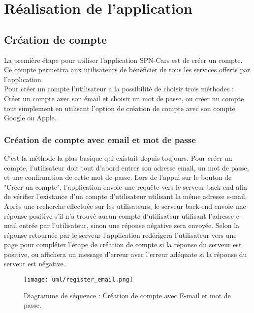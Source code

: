 \thispagestyle{plain}
\section{Réalisation de l'application}
\subsection{Création de compte}
La première étape pour utiliser l'application SPN-Cars est de créer un compte. Ce compte permettra aux utilisateurs de bénéficier de tous les services offerts par l'application.\\
\noindent Pour créer un compte l'utilisateur a la possibilité de choisir trois méthodes : Créer un compte avec son émail et choisir un mot de passe, ou créer un compte tout simplement en utilisant l'option de création de compte avec son compte Google ou Apple.
\subsubsection{Création de compte avec email et mot de passe}
C'est la méthode la plus basique qui existait depuis toujours. Pour créer un compte, l'utilisateur doit tout d'abord entrer son adresse email, un mot de passe, et une confirmation de cette mot de passe. Lors de l'appui sur le bouton de "Créer un compte", l'application envoie une requête vers le serveur back-end afin de vérifier l'existance d'un compte d'utilisateur utilisant la même adresse e-mail. Après une recherche effectuée sur les utilisateurs, le serveur back-end envoie une réponse positive s'il n'a trouvé aucun compte d'utilisateur utilisant l'adresse e-mail entrée par l'utilisateur, sinon une réponse négative sera envoyée. Selon la réponse retournée par le serveur l'application redérigera l'utilisateur vers une page pour compléter l'étape de création de compte si la réponse du serveur est positive, ou affichera un message d'erreur avec l'erreur adéquate si la réponse du serveur est négative.
\begin{figure}[H]
    \centering
    \texttt{[image: uml/register\_email.png]}
    \vspace{1cm}
    \caption{Diagramme de séquence : Création de compte avec E-mail et mot de passe.}
    \label{fig:seq_register_email}
\end{figure}
